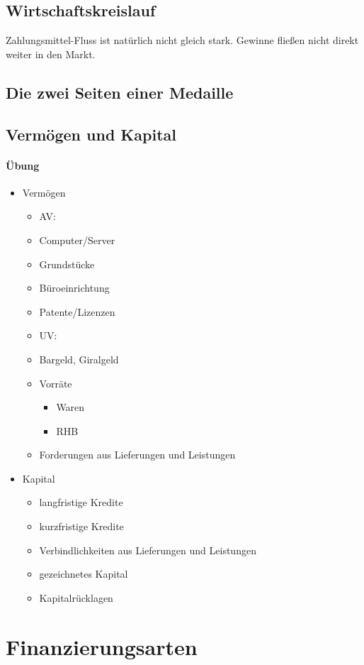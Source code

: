 \documentclass{scrreprt}
\begin{document}
\subsection{Wirtschaftskreislauf}
Zahlungsmittel-Fluss ist natürlich nicht gleich stark. Gewinne fließen nicht direkt weiter in den Markt. 
\subsection{Die zwei Seiten einer Medaille}
\subsection{Vermögen und Kapital}
\paragraph{Übung}
\begin{itemize}
\item Vermögen
\begin{itemize}
\item[] AV:
\item Computer/Server
\item Grundstücke
\item Büroeinrichtung
\item Patente/Lizenzen
\item[] UV:
\item Bargeld, Giralgeld
\item Vorräte
\begin{itemize}
\item Waren
\item RHB
\end{itemize}
\item Forderungen aus Lieferungen und Leistungen
\end{itemize}
\item Kapital
\begin{itemize}
\item langfristige Kredite
\item kurzfristige Kredite
\item Verbindlichkeiten aus Lieferungen und Leistungen
\item gezeichnetes Kapital
\item Kapitalrücklagen
\end{itemize}
\end{itemize}
\section{Finanzierungsarten}
\end{document}
